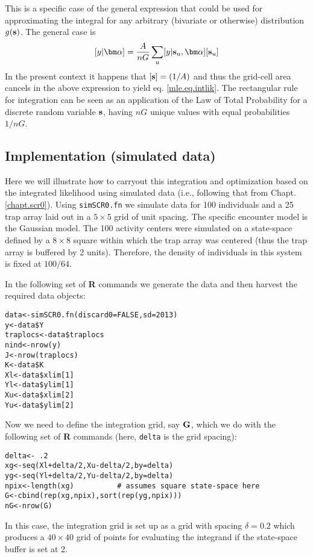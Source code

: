 This is a specific case of the general expression that could be used
for approximating the integral for any arbitrary (bivariate or otherwise)
distribution $g({\bf s})$. The general case is
\[
[y|{\bm \alpha}]  = \frac{A}{nG} \sum_{u} [y|{\bf s}_{u},{\bm \alpha}] [{\bf s}_{u}]
\]
 In the present context it happens that  $[{\bf s}] = (1/A)$
and thus the grid-cell area cancels in the above
expression to yield eq. \ref{mle.eq.intlik}.
The rectangular rule for integration can be seen as an application of
the Law of Total Probability for a discrete random variable ${\bf
  s}$, having $nG$ 
unique values with equal probabilities $1/nG$.


\subsection{Implementation (simulated data)}

Here we will illustrate how to carryout this integration and
optimization based on the integrated likelihood using simulated data
 (i.e., following that from Chapt. \ref{chapt.scr0}). Using \mbox{\tt simSCR0.fn}
 we simulate data for 100 individuals and a 25 trap array
laid out in a $5 \times 5$ grid of unit spacing.  The specific encounter
model is the Gaussian model. The 100 activity centers were
simulated on a state-space defined by a $8 \times 8$ square 
within which the
trap array was centered (thus the trap array is buffered by 2
units). Therefore, the density of individuals in this system is fixed
at $100/64$.

In the following set of {\bf R} commands we generate the data and 
then harvest the required data objects:
{\small
\begin{verbatim}
data<-simSCR0.fn(discard0=FALSE,sd=2013)
y<-data$Y
traplocs<-data$traplocs
nind<-nrow(y)
J<-nrow(traplocs)
K<-data$K
Xl<-data$xlim[1]
Yl<-data$ylim[1]
Xu<-data$xlim[2]
Yu<-data$ylim[2]
\end{verbatim}
}
{\flushleft Now } we need to define the integration grid, say ${\bf G}$, which we do with
the following set of {\bf R} commands (here, \mbox{\tt delta} is the grid spacing):
{\small
\begin{verbatim}
delta<- .2
xg<-seq(Xl+delta/2,Xu-delta/2,by=delta) 
yg<-seq(Yl+delta/2,Yu-delta/2,by=delta) 
npix<-length(xg)          # assumes square state-space here
G<-cbind(rep(xg,npix),sort(rep(yg,npix)))
nG<-nrow(G)
\end{verbatim}
}
{\flushleft In this case}, the integration grid is set up as a grid with spacing
$\delta = 0.2$ which produces a $40 \times 40$ grid of points for evaluating the
integrand if the state-space buffer is set at 2.

